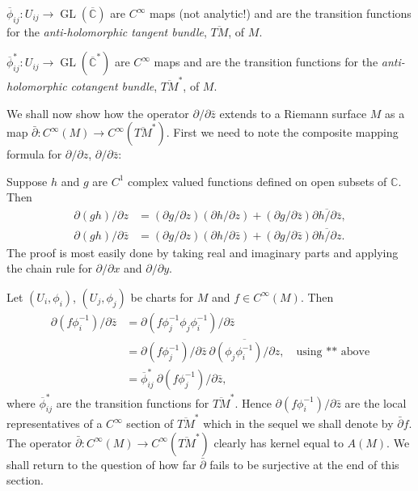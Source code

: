 $\overline\phi_{ij}:U_{ij}\to\operatorname{GL}(\overline{\mathbb C})$ are $C^\infty$ maps (not analytic!) and are the transition functions for the \emph{anti-holomorphic tangent bundle}, $\overline{TM}$, of $M$.

$\overline\phi_{ij}^*:U_{ij}\to\operatorname{GL}(\overline{\mathbb C}^*)$ are $C^\infty$ maps and are the transition functions for the \emph{anti-holomorphic cotangent bundle}, $\overline{TM}^*$, of $M$.

We shall now show how the operator $\partial/\partial\bar z$ extends to a Riemann surface $M$ as a map $\bar\partial:C^\infty(M)\to C^\infty(\overline{TM}^*)$. First we need to note the composite mapping formula for $\partial/\partial z$, $\partial/\partial\bar z$:

Suppose $h$ and $g$ are $C^1$ complex valued functions defined on open subsets of $\mathbb C$. Then
\begin{align}
\partial(gh)/\partial z&=(\partial g/\partial z)(\partial h/\partial z)+(\partial g/\partial\bar z)\overline{\partial h/\partial\bar z},\tag{*}\label{eq:1:star:1}\\
\partial(gh)/\partial\bar z&=(\partial g/\partial z)(\partial h/\partial\bar z)+(\partial g/\partial\bar z)\overline{\partial h/\partial z}.\tag{**}\label{eq:1:star:2}
\end{align}
The proof is most easily done by taking real and imaginary parts and applying the chain rule for $\partial/\partial x$ and $\partial/\partial y$.

Let $(U_i,\phi_i)$, $(U_j,\phi_j)$ be charts for $M$ and $f\in C^\infty(M)$. Then
\begin{align*}
\partial(f\phi_i^{-1})/\partial\bar z
&=\partial(f\phi_j^{-1}\phi_j\phi_i^{-1})/\partial\bar z\\
&=\partial(f\phi_j^{-1})/\partial\bar z\ \overline{\partial(\phi_j\phi_i^{-1})/\partial z},\quad\text{using ** above}\\
&=\overline\phi_{ij}^*\ \partial(f\phi_j^{-1})/\partial\bar z,
\end{align*}
where $\overline\phi_{ij}^*$ are the transition functions for $\overline{TM}^*$. Hence $\partial(f\phi_i^{-1})/\partial\bar z$ are the local representatives of a $C^\infty$ section of $\overline{TM}^*$ which in the sequel we shall denote by $\bar\partial f$. The operator $\bar\partial:C^\infty(M)\to C^\infty(\overline{TM}^*)$ clearly has kernel equal to $A(M)$. We shall return to the question of how far $\bar\partial$ fails to be surjective at the end of this section.

